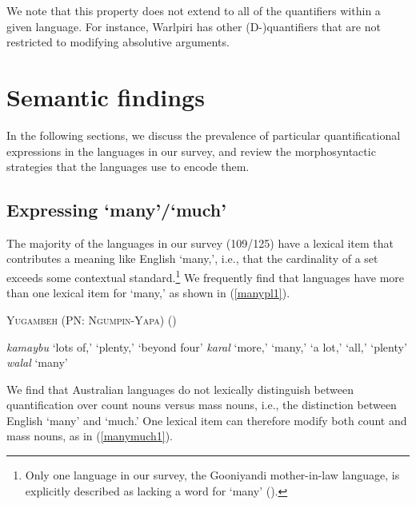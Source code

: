 \documentclass[12pt,egregdoesnotlikesansseriftitles]{scrartcl}
\makeatletter
\newcommand{\ofy}{/125} %
\makeatother
\begin{document}
We note that this property does not extend to all of the quantifiers within a given language. For instance, Warlpiri has other (D-)quantifiers that are not restricted to modifying absolutive arguments.


\section{Semantic findings \label{individquantsection}}

In the following sections, we discuss the prevalence of particular quantificational expressions in the languages in our survey, and review the morphosyntactic strategies that the languages use to encode them.

\subsection{Expressing `many'/`much' \label{manymuchsection}}

The majority of the languages in our survey (109\ofy) have a lexical item that contributes a meaning like English `many,', i.e., that the cardinality of a set exceeds some contextual standard.\footnote{Only one language in our survey, the Gooniyandi mother-in-law language, is explicitly described as lacking a word for `many' (\citealt[636]{mcgregor89}).} We frequently find that languages  have more than one lexical item for `many,' as shown in (\ref{manypl1}). %

\begin{exe}
 \ex  \textsc{Yugambeh (PN: Ngumpin-Yapa)} (\citealt{sharpe98}) \label{manypl1}
  \begin{xlist}
    \ex \textit{kamaybu} `lots of,' `plenty,' `beyond four'
    \ex \textit{karal} `more,' `many,' `a lot,' `all,' `plenty'
    \ex \textit{walal}  `many' 
  \end{xlist} 
\end{exe}

We find that Australian languages do not lexically distinguish between quantification over count nouns versus mass nouns, i.e., the distinction between English `many' and `much.' One lexical item can therefore modify both count and mass nouns, as in (\ref{manymuch1}).
\end{document}
